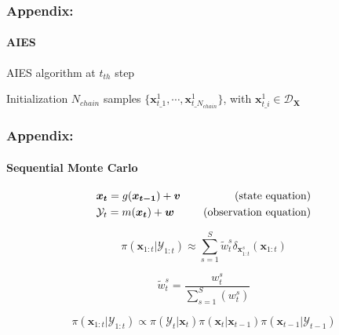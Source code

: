 \begin{frame}
\frametitle{Appendix:}
\framesubtitle{AIES}
\begin{algorithm}[H]    
    \caption{AIES algorithm at $t_{th}$ step}
    \label{Algorithm:AIES}
    Initialization $N_{chain}$ samples $\{  \boldsymbol{x}_{t\_1}^{1},\cdots,\boldsymbol{x}_{t\_{N_{chain}}}^{1}\}$, with $\boldsymbol{x}_{t\_i}^{1} \in \mathcal{D}_{\boldsymbol{X}}$\
    
\end{algorithm}
\end{frame}
\begin{frame}
\frametitle{Appendix:}
\framesubtitle{Sequential Monte Carlo}
\begin{equation*}
\label{eq: Bayesian filtering}
\begin{aligned}
   & \boldsymbol{{x}_{t}}  =g(\boldsymbol{{x}_{t-1}}) + \boldsymbol{v} \ \   \ &\rm{(state  \ equation)}\\    
     &\mathcal{Y}_{t}=m(\boldsymbol{{x}_{t}}) + \boldsymbol{w} \ \ \ \ \ &\rm{(observation \  equation)}
\end{aligned}
\end{equation*}

\begin{equation*}
\pi(\boldsymbol{x}_{1:t}|\mathcal{Y}_{1:t})
\approx 
\sum_{s=1}^{S} 
\tilde{w}_{t}^{s}
\delta_{\boldsymbol{x}_{1:t}^{s}}(\boldsymbol{x}_{1:t})
\end{equation*}

\begin{equation*}
\tilde{w}_t^s=\frac{w_t^s}{\sum_{s=1}^{S}{(w_t^s)}}
\end{equation*}

\begin{equation*}
\pi(\boldsymbol{x}_{1:t}|\mathcal{Y}_{1:t})
    \propto 
    \pi(\mathcal{Y}_{t}|\boldsymbol{x}_{t})
    \pi(\boldsymbol{x}_{t}|\boldsymbol{x}_{t-1})
    \pi(\boldsymbol{x}_{t-1}|\mathcal{Y}_{t-1})
\end{equation*}
\end{frame}

